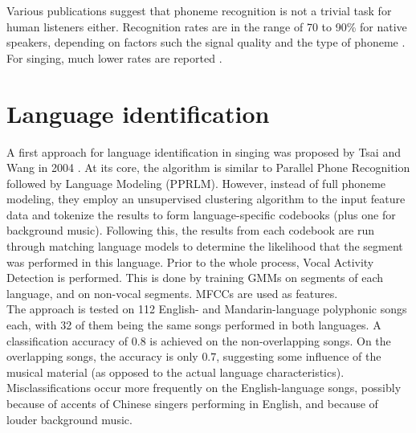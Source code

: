 Various publications suggest that phoneme recognition is not a trivial task for human listeners either. Recognition rates are in the range of 70 to 90\% for native speakers, depending on factors such the signal quality and the type of phoneme \cite{weber_smits}\cite{meyer_waechter}. For singing, much lower rates are reported \cite{hollien}.


\section{Language identification}
A first approach for language identification in singing was proposed by Tsai and Wang in 2004 \cite{tsai_wang}. At its core, the algorithm is similar to Parallel Phone Recognition followed by Language Modeling (PPRLM). However, instead of full phoneme modeling, they employ an unsupervised clustering algorithm to the input feature data and tokenize the results to form language-specific codebooks (plus one for background music). Following this, the results from each codebook are run through matching language models to determine the likelihood that the segment was performed in this language. Prior to the whole process, Vocal Activity Detection is performed. This is done by training GMMs on segments of each language, and on non-vocal segments. MFCCs are used as features.\\
The approach is tested on 112 English- and Mandarin-language polyphonic songs each, with 32 of them being the same songs performed in both languages. A classification accuracy of $0.8$ is achieved on the non-overlapping songs. On the overlapping songs, the accuracy is only $0.7$, suggesting some influence of the musical material (as opposed to the actual language characteristics). Misclassifications occur more frequently on the English-language songs, possibly because of accents of Chinese singers performing in English, and because of louder background music.\\

